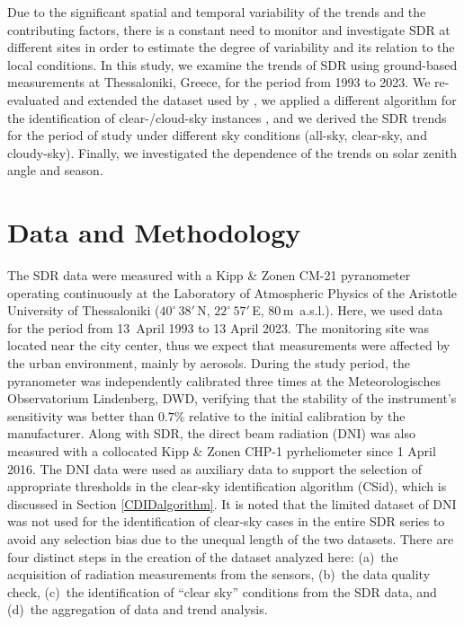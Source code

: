 \documentclass[applsci,article,accept,moreauthors,pdftex]{Definitions/mdpi}
\begin{document}
Due to the significant spatial and temporal variability of the trends
and the contributing factors, there is a constant need to monitor and
investigate SDR at different sites in order to estimate the degree of
variability and its relation to the local conditions. In this study, we
examine the trends of SDR using ground-based measurements at
Thessaloniki, Greece, for the period from 1993 to 2023. We re-evaluated and
extended the dataset used by \citet{Bais2013}, we applied a different
algorithm for the identification of clear-/cloud-sky instances
\citep{Reno2016, Reno2012}, %
and we derived the SDR trends for the
period of study under different sky conditions (all-sky, clear-sky, and
cloudy-sky). Finally, we investigated the dependence of the trends on
solar zenith angle and season.

\hypertarget{data-and-methodology}{%
\section{Data and Methodology}\label{data-and-methodology}}

The SDR data were measured with a Kipp \& Zonen CM-21 pyranometer
operating continuously at the Laboratory of Atmospheric Physics of the
Aristotle University of Thessaloniki (\(40^\circ\,38'\,\)N,
\(22^\circ\,57'\,\)E, \(80\,\)m~a.s.l.). Here, we used data for the period
from 13~April 1993 to 13 April 2023. The monitoring site was located near the
city center, thus we expect that measurements were affected by the urban
environment, mainly by aerosols. During the study period, the
pyranometer was independently calibrated three times at the
Meteorologisches Observatorium Lindenberg, DWD, verifying that the
stability of the instrument's sensitivity was better than \(0.7\%\)
relative to the initial calibration by the manufacturer. Along with SDR,
the direct beam radiation (DNI) was also measured with a collocated Kipp
\& Zonen CHP-1 pyrheliometer since 1 April 2016. The DNI data were used as
auxiliary data to support the selection of appropriate thresholds in the
clear-sky identification algorithm (CSid), which is discussed in Section
\ref{CDIDalgorithm}. It is noted that the limited dataset of DNI was not
used for the identification of clear-sky cases in the entire SDR series
to avoid any selection bias due to the unequal length of the two datasets.
There are four distinct steps in the creation of the dataset analyzed
here: (a)~the acquisition of radiation measurements from the sensors,
(b)~the data quality check, (c)~the identification of ``clear sky''
conditions from the SDR data, and (d)~the aggregation of data and trend
analysis.
\end{document}
